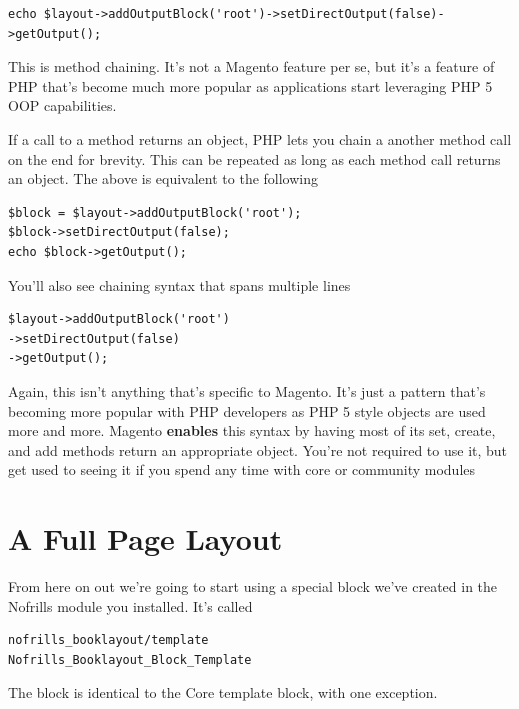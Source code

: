 \documentclass[oneside]{book}
\begin{document}
\begin{lstlisting}
echo $layout->addOutputBlock('root')->setDirectOutput(false)->getOutput();

\end{lstlisting}


This is method chaining. It's not a Magento feature per se, but it's a feature of PHP that's become much more popular as applications start leveraging PHP 5 OOP capabilities.

If a call to a method returns an object, PHP lets you chain a another method call on the end for brevity. This can be repeated as long as each method call returns an object.  The above is equivalent to the following

\begin{lstlisting}
$block = $layout->addOutputBlock('root');
$block->setDirectOutput(false);
echo $block->getOutput();

\end{lstlisting}


You'll also see chaining syntax that spans multiple lines

\begin{lstlisting}
$layout->addOutputBlock('root')
->setDirectOutput(false)
->getOutput();

\end{lstlisting}


Again, this isn't anything that's specific to Magento.  It's just a pattern that's becoming more popular with PHP developers as PHP 5 style objects are used more and more.  Magento \textbf{enables} this syntax by having most of its set, create, and add methods return an appropriate object. You're not required to use it, but get used to seeing it if you spend any time with core or community modules

\section{A Full Page Layout}

From here on out we're going to start using a special block we've created in the Nofrills module you installed.  It's called

\begin{lstlisting}
nofrills_booklayout/template
Nofrills_Booklayout_Block_Template

\end{lstlisting}


The block is identical to the Core template block, with one exception.
\end{document}
